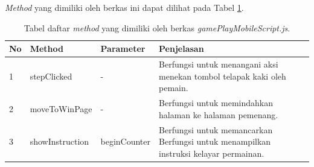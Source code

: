 \begin{enumerate}
\begin{enumerate}
\begin{enumerate}
			\textit{Method} yang dimiliki oleh berkas ini dapat dilihat pada Tabel \ref{table:method_gamePlayMobileScript}.
			\begin{table}[H]
				\centering
				\caption{Tabel daftar \textit{method} yang dimiliki oleh berkas \textit{gamePlayMobileScript.js}.}
				\begin{tabular}{|p{0.35cm}|p{3cm}|p{3cm}|p{7cm}|}
					\hline
					No & Method & Parameter & Penjelasan \\ \hline
					1 & stepClicked & - & Berfungsi untuk menangani aksi menekan tombol telapak kaki oleh pemain. \\ \hline
					2 & moveToWinPage & - & Berfungsi untuk memindahkan halaman ke halaman pemenang. \\ \hline
					3 & showInstruction & beginCounter & Berfungsi untuk memancarkan Berfungsi untuk menampilkan instruksi kelayar permainan. \\ \hline
				\end{tabular}
				\label{table:method_gamePlayMobileScript}
			\end{table}
%				
%				
			

\end{enumerate}
\end{enumerate}
\end{enumerate}
